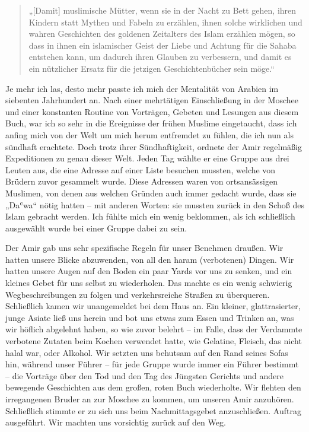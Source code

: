 \documentclass[12pt]{memoir}
\def\`{ʿ} %
\begin{document}
\begin{quote}
„[Damit] muslimische Mütter, wenn sie in der Nacht zu Bett gehen,
ihren Kindern statt Mythen und Fabeln zu erzählen,
ihnen solche wirklichen und wahren Geschichten des goldenen Zeitalters
des Islam erzählen mögen, so dass in ihnen ein islamischer Geist der Liebe
und Achtung für die Sahaba entstehen kann,
um dadurch ihren Glauben zu verbessern,
und damit es ein nützlicher Ersatz
für die jetzigen Geschichtenbücher sein möge.“
\end{quote}

Je mehr ich las, desto mehr passte ich mich der Mentalität
von Arabien im siebenten Jahrhundert an.
Nach einer mehrtätigen Einschließung in der Moschee
und einer konstanten Routine von Vorträgen,
Gebeten und Lesungen aus diesem Buch,
war ich so sehr in die Ereignisse der frühen Muslime eingetaucht,
dass ich anfing mich von der Welt um mich herum entfremdet zu fühlen,
die ich nun als sündhaft erachtete.
Doch trotz ihrer Sündhaftigkeit,
ordnete der Amir regelmäßig Expeditionen zu genau dieser Welt.
Jeden Tag wählte er eine Gruppe aus drei Leuten aus,
die eine Adresse auf einer Liste besuchen mussten,
welche von Brüdern zuvor gesammelt wurde.
Diese Adressen waren von ortsansässigen Muslimen,
von denen aus welchen Gründen auch immer gedacht wurde,
dass sie „Da\`wa“ nötig hatten – mit anderen Worten:
sie mussten zurück in den Schoß des Islam gebracht werden.
Ich fühlte mich ein wenig beklommen,
als ich schließlich ausgewählt wurde bei einer Gruppe dabei zu sein.

Der Amir gab uns sehr spezifische Regeln für unser Benehmen draußen.
Wir hatten unsere Blicke abzuwenden, von all den haram (verbotenen) Dingen.
Wir hatten unsere Augen auf den Boden ein paar Yards vor uns zu senken,
und ein kleines Gebet für uns selbst zu wiederholen.
Das machte es ein wenig schwierig Wegbeschreibungen zu folgen
und verkehrsreiche Straßen zu überqueren.
Schließlich kamen wir unangemeldet bei dem Haus an.
Ein kleiner, glattrasierter, junge Asiate ließ uns herein
und bot uns etwas zum Essen und Trinken an,
was wir höflich abgelehnt haben, so wie zuvor belehrt –
im Falle, dass der Verdammte verbotene Zutaten beim Kochen verwendet hatte,
wie Gelatine, Fleisch, das nicht halal war, oder Alkohol.
Wir setzten uns behutsam auf den Rand seines Sofas hin, während unser Führer –
für jede Gruppe wurde immer ein Führer bestimmt –
die Vorträge über den Tod und den Tag des Jüngsten Gerichts
und andere bewegende Geschichten aus dem großen, roten Buch wiederholte.
Wir flehten den irregangenen Bruder an zur Moschee zu kommen,
um unseren Amir anzuhören.
Schließlich stimmte er zu sich uns beim Nachmittagsgebet anzuschließen.
Auftrag ausgeführt. Wir machten uns vorsichtig zurück auf den Weg.
\end{document}
